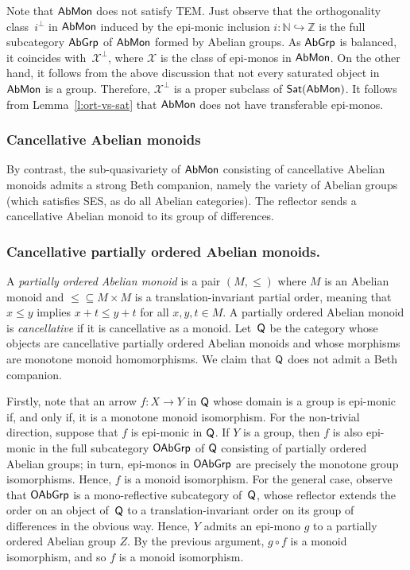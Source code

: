 \documentclass[a4paper,10pt,reqno]{amsart}
\theoremstyle{definition}
\theoremstyle{remark}
\newcommand{\N}{\mathbb{N}}				%
\newcommand{\Z}{\mathbb{Z}}				%
\newcommand{\AMon}{{\sf AbMon}}							%
\newcommand{\AGrp}{{\sf AbGrp}}							%
\newcommand{\COAMon}{\sf Q} %
\newcommand{\OAGrp}{{\sf OAbGrp}}						%
\newcommand{\Sat}{{\sf Sat}}								%
\newcommand{\ar}[1]{\mathcal{#1}}							%
\newcommand{\X}{\ar{X}}									%
\newcommand{\into}{\hookrightarrow}						%
\newcommand{\ort}[1]{{#1}^{\perp}}						%
\renewcommand{\leq}{\leqslant}
\newcommand{\SES}{\textnormal{SES}}
\newcommand{\TEM}{\textnormal{TEM}}
\begin{document}
Note that $\AMon$ does not satisfy \TEM. Just observe that the orthogonality class~$\ort{i}$ in $\AMon$ induced by the epi-monic inclusion $i\colon \N\into\Z$ is the full subcategory $\AGrp$ of $\AMon$ formed by Abelian groups. As $\AGrp$ is balanced, it coincides with~$\ort{\X}$, where $\X$ is the class of epi-monos in $\AMon$. On the other hand, it follows from the above discussion that not every saturated object in $\AMon$ is a group. Therefore, $\ort{\X}$ is a proper subclass of $\Sat(\AMon)$. It follows from Lemma~\ref{l:ort-vs-sat} that $\AMon$ does not have transferable epi-monos.

\subsubsection*{Cancellative Abelian monoids} By contrast, the sub-quasivariety of $\AMon$ consisting of cancellative Abelian monoids admits a strong Beth companion, namely the variety of Abelian groups (which satisfies \SES, as do all Abelian categories). The reflector sends a cancellative Abelian monoid to its group of differences.

\subsubsection*{Cancellative partially ordered Abelian monoids.} 
A \emph{partially ordered Abelian monoid} is a pair $(M,\leq)$ where $M$ is an Abelian monoid and ${\leq}\subseteq M\times M$ is a translation-invariant partial order, meaning that $x\leq y$ implies $x+ t\leq y+t$ for all $x,y,t\in M$. A partially ordered Abelian monoid is \emph{cancellative} if it is cancellative as a monoid. Let~$\COAMon$ be the category whose objects are cancellative partially ordered Abelian monoids and whose morphisms are monotone monoid homomorphisms. We claim that $\COAMon$ does not admit a Beth companion.

Firstly, note that an arrow $f\colon X \to Y$ in $\COAMon$ whose domain is a group is epi-monic if, and only if, it is a monotone monoid isomorphism. For the non-trivial direction, suppose that $f$ is epi-monic in $\COAMon$. If $Y$ is a group, then $f$ is also epi-monic in the full subcategory $\OAGrp$ of $\COAMon$ consisting of partially ordered Abelian groups; in turn, epi-monos in $\OAGrp$ are precisely the monotone group isomorphisms.  
%
Hence, $f$ is a monoid isomorphism. For the general case, observe that $\OAGrp$ is a mono-reflective subcategory of~$\COAMon$, whose reflector extends the order on an object of~$\COAMon$ to a translation-invariant order on its group of differences in the obvious way. Hence, $Y$ admits an epi-mono $g$ to a partially ordered Abelian group $Z$. By the previous argument, $g\circ f$ is a monoid isomorphism, and so $f$ is a monoid isomorphism.
\end{document}
